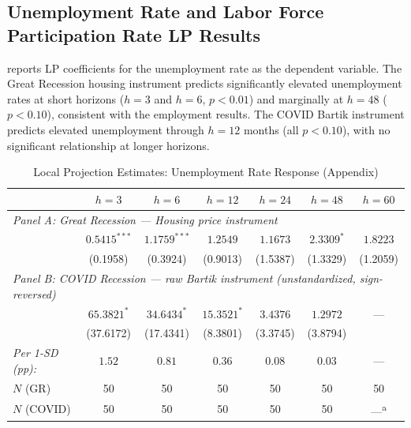 \documentclass[12pt]{article}
\begin{document}
\subsection{Unemployment Rate and Labor Force Participation Rate LP Results}

 reports LP coefficients for the unemployment rate as the dependent variable. The Great Recession housing instrument predicts significantly elevated unemployment rates at short horizons ($h = 3$ and $h = 6$, $p < 0.01$) and marginally at $h = 48$ ($p < 0.10$), consistent with the employment results. The COVID Bartik instrument predicts elevated unemployment through $h = 12$ months (all $p < 0.10$), with no significant relationship at longer horizons.

\begin{table}[H]
\centering
\caption{Local Projection Estimates: Unemployment Rate Response (Appendix)}
\label{tab:app_ur_lp}
\begin{threeparttable}
\small
\begin{tabular}{lcccccc}
\toprule
& $h=3$ & $h=6$ & $h=12$ & $h=24$ & $h=48$ & $h=60$ \\
\midrule
\multicolumn{7}{l}{\textit{Panel A: Great Recession --- Housing price instrument}} \\[3pt]
& $0.5415^{***}$ & $1.1759^{***}$ & $1.2549$ & $1.1673$ & $2.3309^{*}$ & $1.8223$ \\
& (0.1958) & (0.3924) & (0.9013) & (1.5387) & (1.3329) & (1.2059) \\
\midrule
\multicolumn{7}{l}{\textit{Panel B: COVID Recession --- raw Bartik instrument (unstandardized, sign-reversed)}} \\[3pt]
& $65.3821^{*}$ & $34.6434^{*}$ & $15.3521^{*}$ & $3.4376$ & $1.2972$ & --- \\
& (37.6172) & (17.4341) & (8.3801) & (3.3745) & (3.8794) & \\[3pt]
\textit{Per 1-SD (pp):} & $1.52$ & $0.81$ & $0.36$ & $0.08$ & $0.03$ & --- \\
\midrule
$N$ (GR) & 50 & 50 & 50 & 50 & 50 & 50 \\
$N$ (COVID) & 50 & 50 & 50 & 50 & 50 & ---\textsuperscript{a} \\
\bottomrule
\end{tabular}
\begin{tablenotes}[flushleft]
\small

\end{tablenotes}
\end{threeparttable}
\end{table}
\end{document}

